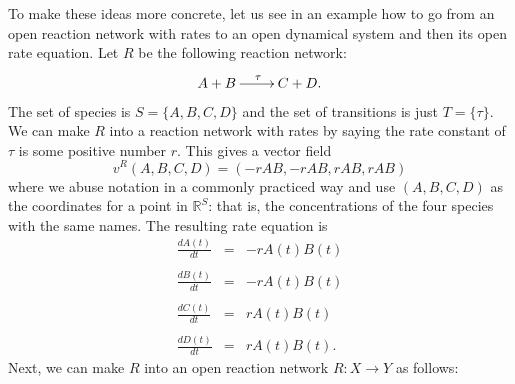 \documentclass{compositionalityarticle}
\newcommand{\R}{\mathbb{R}}
\newcommand{\maps}{\colon}
\theoremstyle{compositionality}
\theoremstyle{remark}
\begin{document}
To make these ideas more concrete, let us see in an example how to go from an open reaction network with rates to an open dynamical system and then its open rate equation.  Let $R$ be the following reaction network:
\[   \xymatrix{ A+B \ar[r]^{\tau} & C + D. }  \] 
The set of species is $S = \{A,B,C,D\}$ and the set of transitions is just $T = \{\tau\}$.   We can make $R$ into a reaction network with rates by saying the rate constant of $\tau$ is some positive number $r$.   This gives a vector field 
\[      v^R(A,B,C,D) = (-r A B, -r A B, r A B, r A B) \]
where we abuse notation in a commonly practiced way and use $(A,B,C,D)$ as the  coordinates for a point in $\R^S$: that is, the concentrations of the four species
with the same names.  The resulting rate equation is
\[ 
\begin{array}{rcl} 
\displaystyle{\frac{dA(t)}{dt}} &=& - r A(t) B(t) \\ \\
\displaystyle{\frac{dB(t)}{dt}} &=& - r A(t) B(t) \\ \\
\displaystyle{\frac{dC(t)}{dt}}&=& r A(t) B(t) \\ \\
\displaystyle{\frac{dD(t)}{dt}} &=& r A(t) B(t) .
\end{array}
\]
Next, we can make $R$ into an open reaction network $R \maps X \to Y$ as follows:
\end{document}
